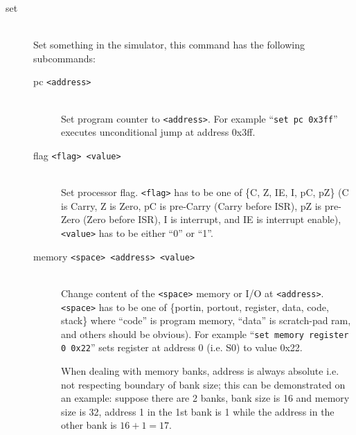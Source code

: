         \begin{description}
            \item[set]~\\
                Set something in the simulator, this command has the following subcommands:
                \begin{description}
                    \item[pc \texttt{<address>}]~\\
                        Set program counter to \texttt{<address>}. For example ``\texttt{set~pc~0x3ff}'' executes unconditional jump at address 0x3ff.
                    \item[flag \texttt{<flag> <value>}]~\\
                        Set processor flag. \texttt{<flag>} has to be one of \{C, Z, IE, I, pC, pZ\} (C is Carry, Z is Zero, pC is pre-Carry (Carry before ISR), pZ is pre-Zero (Zero before ISR), I is interrupt, and IE is interrupt enable), \texttt{<value>} has to be either ``0'' or ``1''.
                    \item[memory \texttt{<space> <address> <value>}]~\\
                        Change content of the \texttt{<space>} memory or I/O at \texttt{<address>}. \texttt{<space>} has to be one of \{portin, portout, register, data, code, stack\} where ``code'' is program memory, ``data'' is scratch-pad ram, and others should be obvious). For example ``\texttt{set memory register 0 0x22}''  sets register at address 0 (i.e. S0) to value 0x22.

                        When dealing with memory banks, address is always absolute i.e. not respecting boundary of bank size; this can be demonstrated on an example: suppose there are 2 banks, bank size is 16 and memory size is 32, address 1 in the 1st bank is 1 while the address in the other bank is $16+1=17$.


\end{description}
\end{description}
